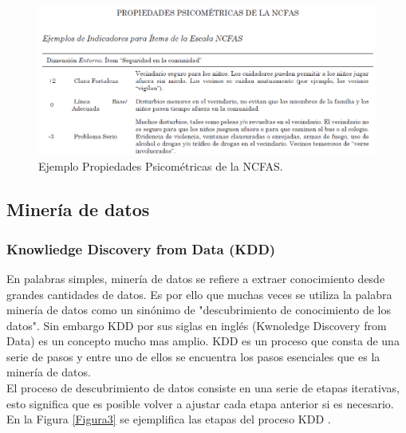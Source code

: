 \begin{figure}[htb]
	\label{Figura2}
	\begin{center}
		\includegraphics[scale=0.6]{imagenes/propncfas.png}
	\end{center}
	\caption{Ejemplo Propiedades Psicométricas de la NCFAS.}
\end{figure}

\clearpage 


\subsection{Minería de datos}

\subsubsection{Knowliedge Discovery from Data (KDD)}

En palabras simples, minería de datos se refiere a extraer conocimiento desde grandes cantidades de datos. Es por ello que muchas veces se utiliza la palabra minería de datos como un sinónimo de "descubrimiento de conocimiento de los datos". Sin embargo KDD por sus siglas en inglés (Kwnoledge Discovery from Data) es un concepto mucho mas amplio. KDD es un proceso que consta de una serie de pasos y entre uno de ellos se encuentra los pasos esenciales que es la minería de datos.\\
El proceso de descubrimiento de datos consiste en una serie de etapas iterativas, esto significa que es posible volver a ajustar cada etapa anterior si es necesario. En la Figura \ref{Figura3} se ejemplifica las etapas del proceso KDD \cite{han2006data}.

